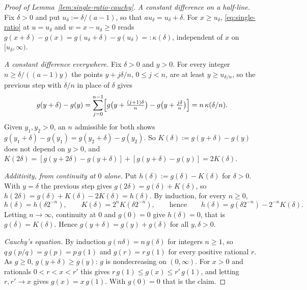 \begin{proof}[Proof of Lemma~\ref{lem:single-ratio-cauchy}]
\emph{A constant difference on a half-line.} Fix $\delta > 0$ and put $u_\delta := \delta/(a-1)$,
so that $a u_\delta = u_\delta + \delta$. For $x \ge u_\delta$, \ref{eq:single-ratio} at
$u = u_\delta$ and $w = x - u_\delta \ge 0$ reads
$g(x+\delta) - g(x) = g(u_\delta + \delta) - g(u_\delta) =: \kappa(\delta)$, independent of $x$ on
$[u_\delta,\infty)$.

\emph{A constant difference everywhere.} Fix $\delta > 0$ and $y > 0$. For every integer
$n \ge \delta/((a-1)y)$ the points $y + j\delta/n$, $0 \le j < n$, are at least
$y \ge u_{\delta/n}$, so the previous step with $\delta/n$ in place of $\delta$ gives
\[
  g(y+\delta) - g(y) = \sum_{j=0}^{n-1}\Bigl[g\bigl(y + \tfrac{(j+1)\delta}{n}\bigr)
     - g\bigl(y + \tfrac{j\delta}{n}\bigr)\Bigr] = n\,\kappa(\delta/n) .
\]
Given $y_1, y_2 > 0$, an $n$ admissible for both shows
$g(y_1+\delta) - g(y_1) = g(y_2+\delta) - g(y_2)$. So $K(\delta) := g(y+\delta) - g(y)$ does not
depend on $y > 0$, and $K(2\delta) = [g(y+2\delta) - g(y+\delta)] + [g(y+\delta) - g(y)]
= 2K(\delta)$.

\emph{Additivity, from continuity at $0$ alone.} Put $h(\delta) := g(\delta) - K(\delta)$ for
$\delta > 0$. With $y = \delta$ the previous step gives $g(2\delta) = g(\delta) + K(\delta)$, so
$h(2\delta) = g(\delta) + K(\delta) - 2K(\delta) = h(\delta)$. By induction, for every $n \ge 0$,
\[
  h(\delta) = h(\delta 2^{-n}) , \qquad K(\delta) = 2^nK(\delta 2^{-n}) , \qquad\text{hence}\qquad
  h(\delta) = g(\delta 2^{-n}) - 2^{-n}K(\delta) .
\]
Letting $n \to \infty$, continuity at $0$ and $g(0) = 0$ give $h(\delta) = 0$, that is
$g(\delta) = K(\delta)$. Hence $g(y + \delta) = g(y) + g(\delta)$ for all $y, \delta > 0$.

\emph{Cauchy's equation.} By induction $g(n\delta) = n\,g(\delta)$ for integers $n \ge 1$, so
$q\,g(p/q) = g(p) = p\,g(1)$ and $g(r) = r\,g(1)$ for every positive rational $r$. As $g \ge 0$,
$g(y+\delta) \ge g(y)$: $g$ is nondecreasing on $(0,\infty)$. For $x > 0$ and rationals
$0 < r < x < r'$ this gives $r\,g(1) \le g(x) \le r'\,g(1)$, and letting $r, r' \to x$ gives
$g(x) = x\,g(1)$. With $g(0) = 0$ that is the claim.
\end{proof}
